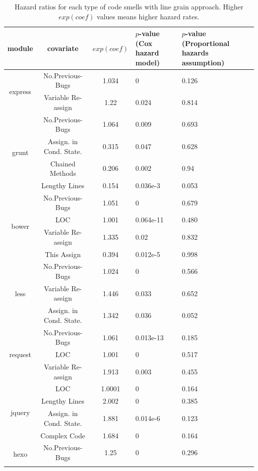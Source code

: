 \begin{table}[t]
	\centering
	\scriptsize
	\caption{Hazard ratios for each type of code smells with line grain approach. Higher $exp(coef)$ values means higher hazard rates.}
	\begin{tabular}{c|c|c|p{1.1cm}|p{1.3cm}}
		\hline
		module & covariate & $exp(coef)$ & $p$-value (Cox hazard model) & $p$-value (Proportional hazards assumption) \\ \hline
		\multirow{2}{*}{express}
		& No.Previous-Bugs & 1.034 & 0 & 0.126 \\ \cline{2-5}
		& Variable Re-assign & 1.22 & 0.024 & 0.814  \\ \hline
		\multirow{4}{*}{grunt} 
		& No.Previous-Bugs & 1.064 & 0.009 & 0.693 \\ \cline{2-5}
		& Assign. in Cond. State. & 0.315 & 0.047 & 0.628 \\ \cline{2-5}
		& Chained Methods & 0.206 & 0.002 & 0.94 \\ \cline{2-5}
		& Lengthy Lines & 0.154 & 0.036e-3 & 0.053 \\ \hline
		\multirow{4}{*}{bower}
		& No.Previous-Bugs & 1.051 & 0 & 0.679 \\ \cline{2-5}
		& LOC & 1.001 & 0.064e-11 & 0.480 \\ \cline{2-5}
		& Variable Re-assign & 1.335 & 0.02 & 0.832 \\ \cline{2-5}
		& This Assign & 0.394 & 0.012e-5 & 0.998 \\ \hline
		\multirow{3}{*}{less}
		& No.Previous-Bugs & 1.024 & 0 & 0.566 \\ \cline{2-5}
		& Variable Re-assign & 1.446 & 0.033 & 0.652 \\ \cline{2-5}
		& Assign. in Cond. State. & 1.342 & 0.036 & 0.052 \\ \hline
		\multirow{3}{*}{request}
		& No.Previous-Bugs & 1.061 & 0.013e-13 & 0.185 \\ \cline{2-5}
		& LOC & 1.001 & 0 & 0.517 \\ \cline{2-5}
		& Variable Re-assign & 1.913 & 0.003 & 0.455 \\ \hline
		\multirow{4}{*}{jquery}
		& LOC & 1.0001 & 0 & 0.164 \\ \cline{2-5}
		& Lengthy Lines & 2.002 & 0 & 0.385 \\ \cline{2-5}
		& Assign. in Cond. State. & 1.881 & 0.014e-6 & 0.123 \\ \cline{2-5}
		& Complex Code & 1.684 & 0 & 0.164 \\ \hline
		\multirow{2}{*}{hexo}
		& No.Previous-Bugs & 1.25 & 0 & 0.296 \\ \cline{2-5}

\end{tabular}
\end{table}
